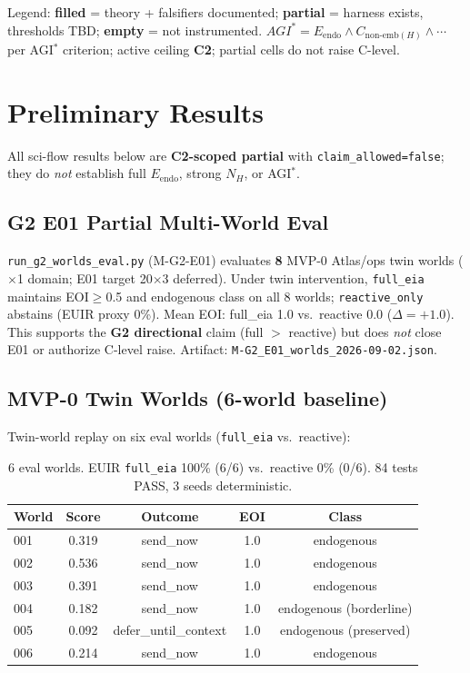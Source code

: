 \documentclass[11pt,a4paper]{article}
\theoremstyle{definition}
\begin{document}
Legend: \textbf{filled} = theory + falsifiers documented; \textbf{partial} = harness exists, thresholds TBD; \textbf{empty} = not instrumented. $AGI^{*}=E_{\mathrm{endo}}\land C_{\mathrm{non\text{-}emb}(H)}\land\cdots$ per AGI$^{*}$ criterion; active ceiling \textbf{C2}; partial cells do not raise C-level.

\section{Preliminary Results}\label{sec:results}
All sci-flow results below are \textbf{C2-scoped partial} with \texttt{claim\_allowed=false}; they do \emph{not} establish full $E_{\mathrm{endo}}$, strong $N_H$, or AGI$^{*}$.

\subsection{G2 E01 Partial Multi-World Eval}
\texttt{run\_g2\_worlds\_eval.py} (M-G2-E01) evaluates \textbf{8} MVP-0 Atlas/ops twin worlds ($\times$1 domain; E01 target 20$\times$3 deferred). Under twin intervention, \texttt{full\_eia} maintains EOI$\geq$0.5 and endogenous class on all 8 worlds; \texttt{reactive\_only} abstains (EUIR proxy 0\%). Mean EOI: full\_eia 1.0 vs.\ reactive 0.0 ($\Delta{=}+1.0$). This supports the \textbf{G2 directional} claim (full $>$ reactive) but does \emph{not} close E01 or authorize C-level raise. Artifact: \texttt{M-G2\_E01\_worlds\_2026-09-02.json}.

\subsection{MVP-0 Twin Worlds (6-world baseline)}
Twin-world replay on six eval worlds (\texttt{full\_eia} vs.\ reactive):

\begin{table}[H]
\centering\small
\begin{tabular}{lcccc}
\toprule World & Score & Outcome & EOI & Class \\ \midrule
001 & 0.319 & send\_now & 1.0 & endogenous \\
002 & 0.536 & send\_now & 1.0 & endogenous \\
003 & 0.391 & send\_now & 1.0 & endogenous \\
004 & 0.182 & send\_now & 1.0 & endogenous (borderline) \\
005 & 0.092 & defer\_until\_context & 1.0 & endogenous (preserved) \\
006 & 0.214 & send\_now & 1.0 & endogenous \\ \bottomrule
\end{tabular}
\caption{6 eval worlds. EUIR \texttt{full\_eia} 100\% (6/6) vs.\ reactive 0\% (0/6). 84 tests PASS, 3 seeds deterministic.}
\end{table}
\end{document}
